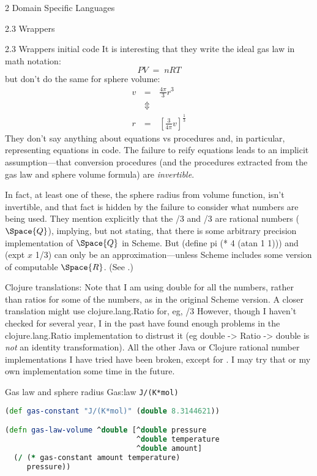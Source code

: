 \documentclass[11pt]{PalisadesLakesBook}
\begin{document}
\begin{plSection}{}
\begin{plSection}{2 Domain Specific Languages}
\begin{plSection}{2.3 Wrappers}
\begin{plSection}{2.3 Wrappers initial code}
It is interesting that they write the ideal gas law 
in math notation:
\begin{equation}
PV \; = \; nRT 
\end{equation}
but don't do the same for sphere volume:
\begin{eqnarray}
v \, & = & \, \frac{4\pi}{3} r^{3} \\  
& \Updownarrow & \nonumber \\
r \, & = & \, \left[ \frac{3}{4\pi} v\right]^{\frac{1}{3}}
\end{eqnarray}
They don't say anything about equations vs procedures
and, in particular, representing equations in code.
The failure to reify equations leads to an implicit
assumption---that conversion procedures 
(and the procedures extracted from the gas law and sphere volume
formula) are \emph{invertible}.

In fact, at least one of these, the sphere radius from volume
function, isn't invertible, and that fact is hidden by the
failure to consider what numbers are being used.
They mention explicitly that the {/3} 
and {/3}
are rational numbers ($\Space{Q}$), implying, but not stating,
that there is some arbitrary precision implementation of
$\Space{Q}$ in Scheme.
But {\schemeFont (define pi (* 4 (atan 1 1)))}
and {\schemeFont (expt $x$ 1/3)}
can only be an approximation---unless Scheme includes some version
of computable $\Space{R}$.
(See .)

Clojure translations:
Note that I am using {\javaFont double} for all the numbers,
rather than ratios for some of the numbers,
as in the original Scheme version.
A closer translation might use {\clojureFont clojure.lang.Ratio}
for, eg, {/3}
However, though I haven't checked for several year,
I in the past have found enough problems in the 
{\clojureFont clojure.lang.Ratio} implementation to distrust it
(eg {\clojureFont double -> Ratio -> double} is \emph{not}
an identity transformation).
All the other Java or Clojure rational number implementations
I have tried have been broken, except for 
.
I may try that or my own implementation some time in the future.
\begin{plListing}
{Gas law and sphere radius}
{Gas:law}
\texttt{J/(K*mol)}
\begin{lstlisting}[language=clojure]
(def gas-constant "J/(K*mol)" (double 8.3144621))

(defn gas-law-volume ^double [^double pressure 
                              ^double temperature 
                              ^double amount]
  (/ (* gas-constant amount temperature)
     pressure))


\end{lstlisting}
\end{plListing}
\end{plSection}
\end{plSection}
\end{plSection}
\end{plSection}
\end{document}
